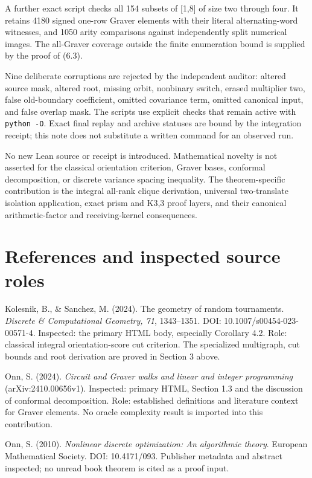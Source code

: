 A further exact script checks all 154 subsets of {[}1,8{]} of size two through four. It retains 4180 signed one-row Graver elements with their literal alternating-word witnesses, and 1050 arity comparisons against independently split numerical images. The all-Graver coverage outside the finite enumeration bound is supplied by the proof of (6.3).

Nine deliberate corruptions are rejected by the independent auditor: altered source mask, altered root, missing orbit, nonbinary switch, erased multiplier two, false old-boundary coefficient, omitted covariance term, omitted canonical input, and false overlap mask. The scripts use explicit checks that remain active with \texttt{python\ -O}. Exact final replay and archive statuses are bound by the integration receipt; this note does not substitute a written command for an observed run.

No new Lean source or receipt is introduced. Mathematical novelty is not asserted for the classical orientation criterion, Graver bases, conformal decomposition, or discrete variance spacing inequality. The theorem-specific contribution is the integral all-rank clique derivation, universal two-translate isolation application, exact prism and K3,3 proof layers, and their canonical arithmetic-factor and receiving-kernel consequences.

\section{References and inspected source roles}\label{n18-references-and-inspected-source-roles}

Kolesnik, B., \& Sanchez, M. (2024). The geometry of random tournaments. \emph{Discrete \& Computational Geometry, 71}, 1343--1351. DOI: 10.1007/s00454-023-00571-4. Inspected: the primary HTML body, especially Corollary 4.2. Role: classical integral orientation-score cut criterion. The specialized multigraph, cut bounds and root derivation are proved in Section 3 above.

Onn, S. (2024). \emph{Circuit and Graver walks and linear and integer programming} (arXiv:2410.00656v1). Inspected: primary HTML, Section 1.3 and the discussion of conformal decomposition. Role: established definitions and literature context for Graver elements. No oracle complexity result is imported into this contribution.

Onn, S. (2010). \emph{Nonlinear discrete optimization: An algorithmic theory}. European Mathematical Society. DOI: 10.4171/093. Publisher metadata and abstract inspected; no unread book theorem is cited as a proof input.

